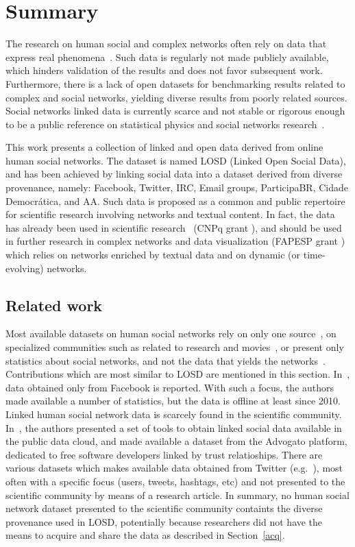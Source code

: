 \documentclass[journal,article,submit,moreauthors,pdftex]{Definitions/mdpi}
\begin{document}
\section{Summary}
The research on human social and complex networks often rely on data that express real phenomena~\cite{c1,c2,c3}.
Such data is regularly not made publicly available,
which hinders validation of the results
and does not favor subsequent work.
Furthermore, there is a lack of open datasets for benchmarking results
related to complex and social networks,
yielding diverse results from poorly related sources.
Social networks linked data is currently scarce and not stable
or rigorous enough to be a public reference on statistical physics
and social networks research~\cite{l1,l2}.

This work presents a collection of linked and open data
derived from online human social networks.
The dataset is named LOSD (Linked Open Social Data),
and has been achieved by linking social data into a dataset derived from diverse
provenance, namely: Facebook, Twitter, IRC, Email groups, ParticipaBR, Cidade Democrática, and AA.
Such data is proposed as a common and public repertoire for scientific
research involving networks and textual content.
In fact, the data has already been used in scientific research~\cite{stab,thesis} (CNPq grant ), and should be used in further research in complex networks and data visualization (FAPESP grant ) which relies on networks enriched by textual data and on dynamic (or time-evolving) networks.


\subsection{Related work}
Most available datasets on human social networks rely on only one source~\cite{o1,o2,o3,o4},
on specialized communities such as related to research and movies~\cite{s1,s2,s3,s4,s5},
or present only statistics about social networks, and not the data that yields the networks~\cite{st1,st2,st3,st4}.
Contributions which are most similar to LOSD are mentioned in this section.
In~\cite{fb1}, data obtained only from Facebook is reported.
With such a focus, the authors made available a number of statistics,
but the data is offline at least since 2010.
Linked human social network data is scarcely found in the scientific community.
In~\cite{foaf1}, the authors presented a set of tools to obtain linked social data available in the public data cloud, and made available a dataset from the Advogato platform,
dedicated to free software developers linked by trust relatioships.
There are various datasets which makes available data obtained from Twitter (e.g.~\cite{tw1,tw2,t3,t4}),
most often with a specific focus (users, tweets, hashtags, etc)
and not presented to the scientific community by means of a research article.
In summary, no human social network dataset presented to the
scientific community containts the diverse provenance used in LOSD,
potentially because researchers did not have the means to acquire and
share the data as described in Section~\ref{acq}.
\end{document}
